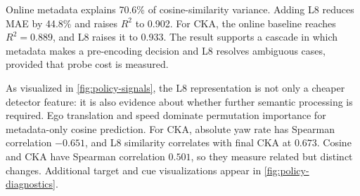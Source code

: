 \documentclass[10pt,twocolumn,letterpaper]{article}
\begin{document}
\begin{table}[t]
\centering
\small
\caption{Grouped-CV regression of final-feature similarity. Values are mean $\pm$ standard deviation across five scene folds. Offline metadata is an oracle. MAE is target-specific.}
\label{tab:signal-regression}
\end{table}

Online metadata explains 70.6\% of cosine-similarity variance. Adding L8 reduces MAE by 44.8\% and raises $R^2$ to 0.902. For CKA, the online baseline reaches $R^2=0.889$, and L8 raises it to 0.933. The result supports a cascade in which metadata makes a pre-encoding decision and L8 resolves ambiguous cases, provided that probe cost is measured.


As visualized in \cref{fig:policy-signals}, the L8 representation is not only a cheaper detector feature: it is also evidence about whether further semantic processing is required. Ego translation and speed dominate permutation importance for metadata-only cosine prediction. For CKA, absolute yaw rate has Spearman correlation $-0.651$, and L8 similarity correlates with final CKA at $0.673$. Cosine and CKA have Spearman correlation $0.501$, so they measure related but distinct changes. Additional target and cue visualizations appear in \cref{fig:policy-diagnostics}.
\end{document}

